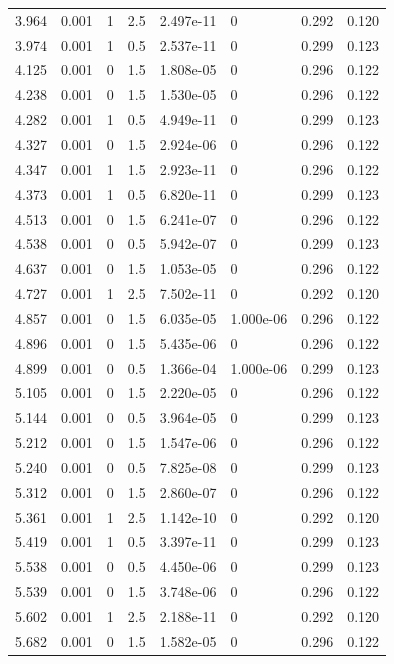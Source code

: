 \documentclass[preview]{standalone}
\begin{document}
{{{\begin{tabular}{L{1.2cm}C{1.2cm} C{0.3cm}C{0.5cm} C{1.4cm}C{1.4cm} C{1.4cm}C{1.4cm}}
  3.964  &  0.001  & 1     & 2.5 &  2.497e-11  & 0  & 0.292 &  0.120   \\ 
  3.974  &  0.001  & 1     & 0.5 &  2.537e-11  & 0  & 0.299 &  0.123   \\ 
  4.125  &  0.001  & 0     & 1.5 &  1.808e-05  & 0  & 0.296 &  0.122   \\ 
  4.238  &  0.001  & 0     & 1.5 &  1.530e-05  & 0  & 0.296 &  0.122   \\ 
  4.282  &  0.001  & 1     & 0.5 &  4.949e-11  & 0  & 0.299 &  0.123   \\ 
  4.327  &  0.001  & 0     & 1.5 &  2.924e-06  & 0  & 0.296 &  0.122   \\ 
  4.347  &  0.001  & 1     & 1.5 &  2.923e-11  & 0  & 0.296 &  0.122   \\ 
  4.373  &  0.001  & 1     & 0.5 &  6.820e-11  & 0  & 0.299 &  0.123   \\ 
  4.513  &  0.001  & 0     & 1.5 &  6.241e-07  & 0  & 0.296 &  0.122   \\ 
  4.538  &  0.001  & 0     & 0.5 &  5.942e-07  & 0  & 0.299 &  0.123   \\ 
  4.637  &  0.001  & 0     & 1.5 &  1.053e-05  & 0  & 0.296 &  0.122   \\ 
  4.727  &  0.001  & 1     & 2.5 &  7.502e-11  & 0  & 0.292 &  0.120   \\ 
  4.857  &  0.001  & 0     & 1.5 &  6.035e-05  & 1.000e-06  & 0.296 &  0.122   \\ 
  4.896  &  0.001  & 0     & 1.5 &  5.435e-06  & 0  & 0.296 &  0.122   \\ 
  4.899  &  0.001  & 0     & 0.5 &  1.366e-04  & 1.000e-06  & 0.299 &  0.123   \\ 
  5.105  &  0.001  & 0     & 1.5 &  2.220e-05  & 0  & 0.296 &  0.122   \\ 
  5.144  &  0.001  & 0     & 0.5 &  3.964e-05  & 0  & 0.299 &  0.123   \\ 
  5.212  &  0.001  & 0     & 1.5 &  1.547e-06  & 0  & 0.296 &  0.122   \\ 
  5.240  &  0.001  & 0     & 0.5 &  7.825e-08  & 0  & 0.299 &  0.123   \\ 
  5.312  &  0.001  & 0     & 1.5 &  2.860e-07  & 0  & 0.296 &  0.122   \\ 
  5.361  &  0.001  & 1     & 2.5 &  1.142e-10  & 0  & 0.292 &  0.120   \\ 
  5.419  &  0.001  & 1     & 0.5 &  3.397e-11  & 0  & 0.299 &  0.123   \\ 
  5.538  &  0.001  & 0     & 0.5 &  4.450e-06  & 0  & 0.299 &  0.123   \\ 
  5.539  &  0.001  & 0     & 1.5 &  3.748e-06  & 0  & 0.296 &  0.122   \\ 
  5.602  &  0.001  & 1     & 2.5 &  2.188e-11  & 0  & 0.292 &  0.120   \\ 
  5.682  &  0.001  & 0     & 1.5 &  1.582e-05  & 0  & 0.296 &  0.122   \\ 
\hline 
\end{tabular} 

}}}
\end{document}
